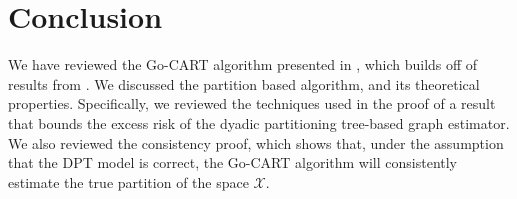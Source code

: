 \documentclass[12pt]{article}
\begin{document}




\section{Conclusion}

We have reviewed the Go-CART algorithm presented in \cite{liu2010},
which builds off of results from \cite{friedman2008}. We discussed the
partition based algorithm, and its theoretical
properties. Specifically, we reviewed the techniques used in the proof
of a result that bounds the excess risk of the dyadic partitioning
tree-based graph estimator. We also reviewed the consistency proof,
which shows that, under the assumption that the DPT model is correct,
the Go-CART algorithm will consistently estimate the true partition of
the space $\mathcal{X}$.



\end{document}
